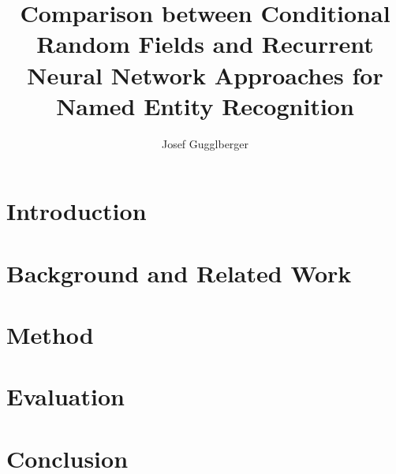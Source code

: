 \documentclass[12pt]{book}
\begin{document}
    \title{Comparison between Conditional Random Fields and Recurrent Neural Network Approaches for Named Entity Recognition}
    \author{Josef Gugglberger}
 
    \beforepreface

 	\afterpreface
 	
 	
    \chapter{Introduction}
   
	\chapter{Background and Related Work}

	\chapter{Method}

	\chapter{Evaluation}

	\chapter{Conclusion}
\end{document}
